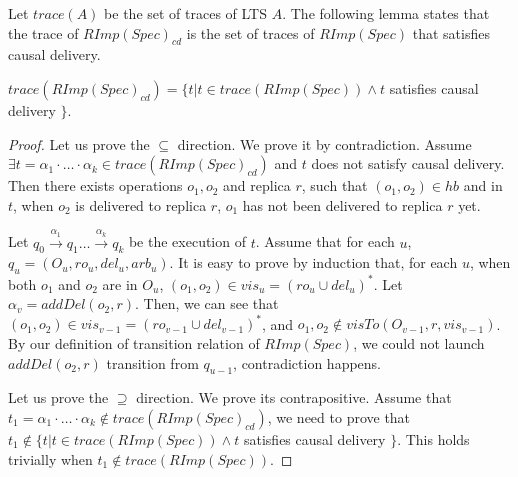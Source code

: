 Let $\mathit{trace}(A)$ be the set of traces of LTS $A$. The following lemma states that the trace of $\mathit{RImp}(\mathit{Spec})_{\mathit{cd}}$ is the set of traces of $\mathit{RImp}(\mathit{Spec})$ that satisfies causal delivery. 

\begin{lemma}
\label{lemma:RImpcdSpec contains all the sequences of RImpSpec that are causal delivery}
$\mathit{trace}( \mathit{RImp}(\mathit{Spec})_{\mathit{cd}} ) = \{ t \vert t \in \mathit{trace}( \mathit{RImp}(\mathit{Spec}) ) \wedge t$ satisfies causal delivery $\}$. 
\end{lemma} 

\begin {proof}

Let us prove the $\subseteq$ direction. We prove it by contradiction. Assume $\exists t =\alpha_1 \cdot \ldots \cdot \alpha_k \in \mathit{trace}( \mathit{RImp}(\mathit{Spec})_{\mathit{cd}} )$ and $t$ does not satisfy causal delivery. Then there exists operations $o_1,o_2$ and replica $r$, such that $(o_1,o_2) \in \mathit{hb}$ and in $t$, when $o_2$ is delivered to replica $r$, $o_1$ has not been delivered to replica $r$ yet.

Let $q_0 {\xrightarrow{\alpha_1}} q_1 \ldots {\xrightarrow{\alpha_k}} q_k$ be the execution of $t$. Assume that for each $u$, $q_u = (O_u,\mathit{ro}_u,\mathit{del}_u,\mathit{arb}_u)$. It is easy to prove by induction that, for each $u$, when both $o_1$ and $o_2$ are in $O_u$, $(o_1,o_2) \in \mathit{vis}_u = (\mathit{ro}_u \cup \mathit{del}_u)^*$. Let $\alpha_v = \mathit{addDel}(o_2,r)$. Then, we can see that $(o_1,o_2) \in \mathit{vis}_{v-1} = (\mathit{ro}_{v-1} \cup \mathit{del}_{v-1})^*$, and $o_1,o_2 \notin \mathit{visTo}(O_{v-1},r,\mathit{vis}_{v-1})$. By our definition of transition relation of $\mathit{RImp}(\mathit{Spec})$, we could not launch $\mathit{addDel}(o_2,r)$ transition from $q_{u-1}$, contradiction happens. 

Let us prove the $\supseteq$ direction. We prove its contrapositive. Assume that $t_1 =\alpha_1 \cdot \ldots \cdot \alpha_k \notin \mathit{trace}( \mathit{RImp}(\mathit{Spec})_{\mathit{cd}} )$, we need to prove that $t_1 \notin \{ t \vert t \in \mathit{trace}( \mathit{RImp}(\mathit{Spec}) ) \wedge t$ satisfies causal delivery $\}$. This holds trivially when $t_1 \notin \mathit{trace}( \mathit{RImp}(\mathit{Spec}) )$. 


\end{proof}
